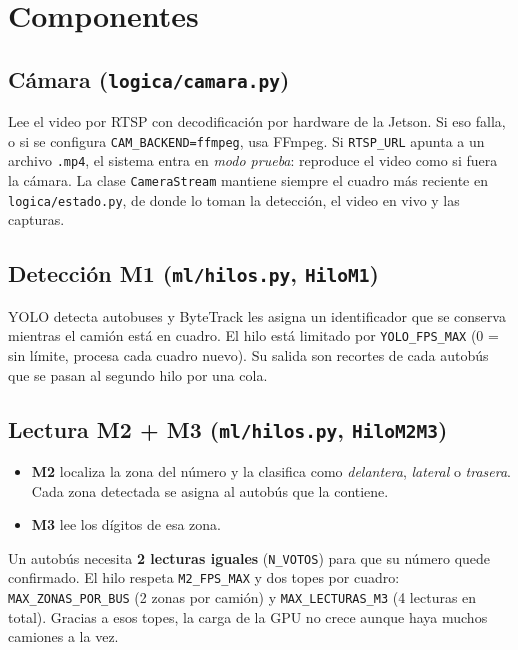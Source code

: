 \section{Componentes}

\subsection{Cámara (\texttt{logica/camara.py})}

Lee el video por RTSP con decodificación por hardware de la Jetson. Si eso
falla, o si se configura \texttt{CAM\_BACKEND=ffmpeg}, usa FFmpeg. Si
\texttt{RTSP\_URL} apunta a un archivo \texttt{.mp4}, el sistema entra en
\emph{modo prueba}: reproduce el video como si fuera la cámara. La clase
\texttt{CameraStream} mantiene siempre el cuadro más reciente en
\texttt{logica/estado.py}, de donde lo toman la detección, el video en vivo y
las capturas.

\subsection{Detección M1 (\texttt{ml/hilos.py}, \texttt{HiloM1})}

YOLO detecta autobuses y ByteTrack les asigna un identificador que se conserva
mientras el camión está en cuadro. El hilo está limitado por
\texttt{YOLO\_FPS\_MAX} (0 = sin límite, procesa cada cuadro nuevo). Su salida
son recortes de cada autobús que se pasan al segundo hilo por una cola.

\subsection{Lectura M2 + M3 (\texttt{ml/hilos.py}, \texttt{HiloM2M3})}

\begin{itemize}
  \item \textbf{M2} localiza la zona del número y la clasifica como
        \emph{delantera}, \emph{lateral} o \emph{trasera}. Cada zona detectada
        se asigna al autobús que la contiene.
  \item \textbf{M3} lee los dígitos de esa zona.
\end{itemize}

Un autobús necesita \textbf{2 lecturas iguales} (\texttt{N\_VOTOS}) para que su
número quede confirmado. El hilo respeta \texttt{M2\_FPS\_MAX} y dos topes por
cuadro: \texttt{MAX\_ZONAS\_POR\_BUS} (2 zonas por camión) y
\texttt{MAX\_LECTURAS\_M3} (4 lecturas en total). Gracias a esos topes, la carga
de la GPU no crece aunque haya muchos camiones a la vez.

